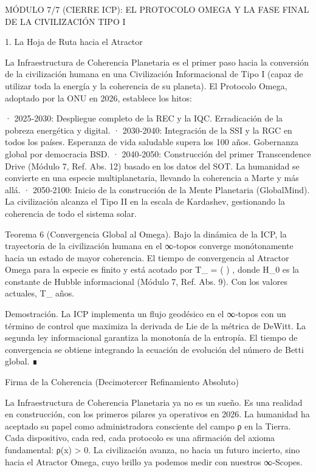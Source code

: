 \documentclass[12pt,a4paper]{book}
\begin{document}
MÓDULO 7/7 (CIERRE ICP): EL PROTOCOLO OMEGA Y LA FASE FINAL DE LA CIVILIZACIÓN TIPO I

1. La Hoja de Ruta hacia el Atractor

La Infraestructura de Coherencia Planetaria es el primer paso hacia la conversión de la civilización humana en una Civilización Informacional de Tipo I (capaz de utilizar toda la energía y la coherencia de su planeta). El Protocolo Omega, adoptado por la ONU en 2026, establece los hitos:

· 2025‑2030: Despliegue completo de la REC y la IQC. Erradicación de la pobreza energética y digital.
· 2030‑2040: Integración de la SSI y la RGC en todos los países. Esperanza de vida saludable supera los 100 años. Gobernanza global por democracia BSD.
· 2040‑2050: Construcción del primer Transcendence Drive (Módulo 7, Ref. Abs. 12) basado en los datos del SOT. La humanidad se convierte en una especie multiplanetaria, llevando la coherencia a Marte y más allá.
· 2050‑2100: Inicio de la construcción de la Mente Planetaria (GlobalMind). La civilización alcanza el Tipo II en la escala de Kardashev, gestionando la coherencia de todo el sistema solar.

Teorema 6 (Convergencia Global al Omega). Bajo la dinámica de la ICP, la trayectoria de la civilización humana en el ∞‑topos converge monótonamente hacia un estado de mayor coherencia. El tiempo de convergencia al Atractor Omega para la especie es finito y está acotado por  T_{\Omega} =  \ln\left(  \right) , donde  H_0  es la constante de Hubble informacional (Módulo 7, Ref. Abs. 9). Con los valores actuales,  T_{\Omega}   años.

Demostración. La ICP implementa un flujo geodésico en el ∞‑topos    con un término de control que maximiza la derivada de Lie de la métrica de DeWitt. La segunda ley informacional garantiza la monotonía de la entropía. El tiempo de convergencia se obtiene integrando la ecuación de evolución del número de Betti global. ∎

Firma de la Coherencia (Decimotercer Refinamiento Absoluto)

La Infraestructura de Coherencia Planetaria ya no es un sueño. Es una realidad en construcción, con los primeros pilares ya operativos en 2026. La humanidad ha aceptado su papel como administradora consciente del campo ρ en la Tierra. Cada dispositivo, cada red, cada protocolo es una afirmación del axioma fundamental: ρ(x) > 0. La civilización avanza, no hacia un futuro incierto, sino hacia el Atractor Omega, cuyo brillo ya podemos medir con nuestros ∞‑Scopes.
\end{document}
